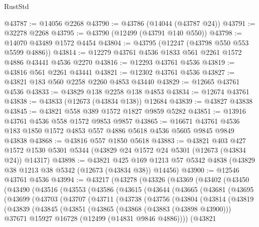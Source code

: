 \begin{lexlean}{RustStd}
\begin{coremodule}
@43787 := @14056 @2268
@43790 := @43786 (@14044 (@43787 @24))
@43791 := @32278 @2268
@43795 := @43790 (@12499 (@43791 @140 @550))
@43798 := @14070 @43489 @1572 @4454
@43804 := @43795 (@12247 (@43798 @550 @553 @5599 @4886))
@43814 := @12279 @43761 @4536 @1833 @561 @2261 @1572 @4886 @43441 @4536 @2270
@43816 := @12293 @43761 @4536
@43819 := @43816 @561 @2261 @43441
@43821 := @12302 @43761 @4536
@43827 := @43821 @183 @560 @2258 @2260 @4853 @43440
@43829 := @12665 @43761 @4536
@43833 := @43829 @138 @2258 @138 @4853
@43834 := @12674 @43761
@43838 := @43833 (@12673 (@43834 @138)) @12684
@43839 := @43827 @43838
@43845 := @43821 @558 @389 @1572 @1827 @9859 @5282
@43851 := @13916 @43761 @4536 @558 @1572 @9853 @9857
@43865 := @16671 @43761 @4536 @183 @1850 @1572 @4853 @557 @4886 @5618 @4536 @5605 @9845 @9849 @43838
@43868 := @43816 @557 @1850 @5618
@43883 := @43821
    @403
    @427
    @1572
    @1530
    @5301
    @5344
    (@43829 @24 @1572 @24 @5301 (@12673 (@43834 @24)) @14317)
@43898 := @43821
    @425
    @169
    @1213
    @57
    @5342
    @4838
    (@43829 @38 @1213 @38 @5342 (@12673 (@43834 @38)) @14456)
@43900 := @12546 @43761 @4536
@43994 := @43217
    (@43278
      (@43326
        (@43369
          (@43402
            (@43450
              (@43490
                (@43516
                  (@43553
                    (@43586
                      (@43615
                        (@43644
                          (@43665
                            (@43681
                              (@43695
                                (@43699
                                  (@43703
                                    (@43707
                                      (@43711
                                        (@43738
                                          (@43756
                                            (@43804
                                              (@43814
                                                (@43819
                                                  (@43839
                                                    (@43845
                                                      (@43851
                                                        (@43865
                                                          (@43868 (@43883 (@43898 @43900)))
                                                          @37671
                                                          @15927
                                                          @16728
                                                          (@12499 (@14831 @9846 @4886))))
                                                      (@43821

\end{coremodule}
\end{lexlean}
